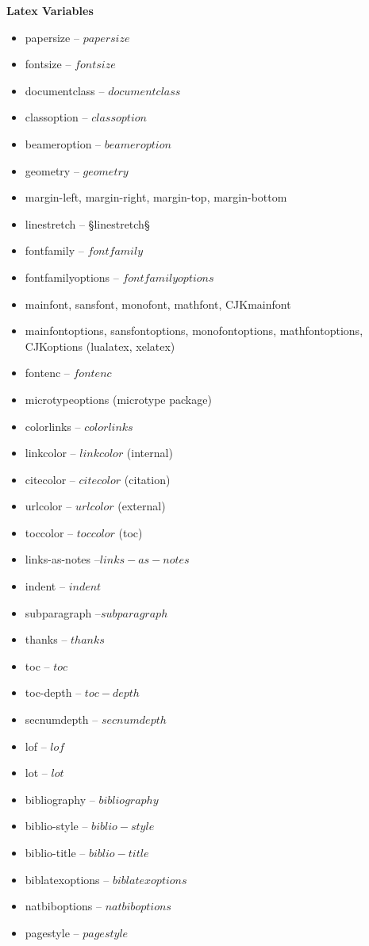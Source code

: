 \documentclass[$if(fontsize)$$fontsize$,$endif$$if(lang)$$babel-lang$,$endif$$if(papersize)$$papersize$paper,$endif$$for(classoption)$$classoption$$sep$,$endfor$]{$documentclass$}
\begin{document}
{\textbf{Latex Variables}
\begin{itemize}
        \item papersize -- $papersize$
        \item fontsize -- $fontsize$
        \item documentclass -- $documentclass$
        \item classoption -- $classoption$
        \item beameroption -- $beameroption$
        \item geometry -- $geometry$
        \item margin-left, margin-right, margin-top, margin-bottom %
        \item linestretch -- §linestretch§
        \item fontfamily -- $fontfamily$
        \item fontfamilyoptions -- $fontfamilyoptions$
        \item mainfont, sansfont, monofont, mathfont, CJKmainfont
        \item mainfontoptions, sansfontoptions, monofontoptions, mathfontoptions, CJKoptions (lualatex, xelatex)
        \item fontenc -- $fontenc$
        \item microtypeoptions (microtype package)
        \item colorlinks -- $colorlinks$
        \item linkcolor -- $linkcolor$ (internal)
        \item citecolor -- $citecolor$ (citation)
        \item urlcolor -- $urlcolor$ (external)
        \item toccolor -- $toccolor$ (toc)
        \item links-as-notes --$links-as-notes$
        \item indent -- $indent$
        \item subparagraph --$subparagraph$
        \item thanks -- $thanks$
        \item toc -- $toc$
        \item toc-depth -- $toc-depth$
        \item secnumdepth -- $secnumdepth$
        \item lof -- $lof$
        \item lot -- $lot$
        \item bibliography -- $bibliography$
        \item biblio-style -- $biblio-style$
        \item biblio-title -- $biblio-title$
        \item biblatexoptions -- $biblatexoptions$
        \item natbiboptions -- $natbiboptions$
        \item pagestyle -- $pagestyle$
\end{itemize}

}
\end{document}
